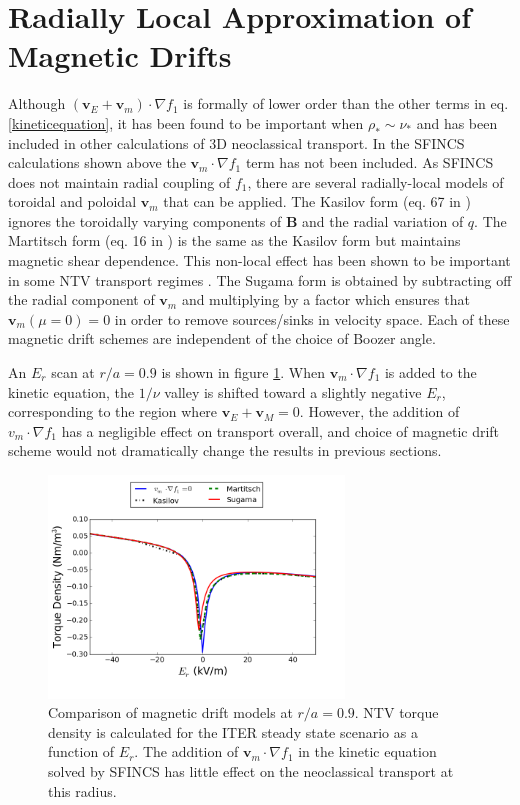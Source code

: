 \documentclass{article}
\numberwithin{figure}{section}
\numberwithin{equation}{section}
\begin{document}
\FloatBarrier

\section{Radially Local Approximation of Magnetic Drifts}\label{mds}
Although $(\bm{v}_E + \bm{v}_m) \cdot \nabla f_1$ is formally of lower order than the other terms in eq. \ref{kineticequation}, it has been found to be important when $\rho_* \sim \nu_*$ and has been included in other calculations of 3D neoclassical transport. In the SFINCS calculations shown above the $\bm{v}_m \cdot \nabla f_1$ term has not been included. As SFINCS does not maintain radial coupling of $f_1$, there are several radially-local models of toroidal and poloidal $\bm{v}_m$ that can be applied.  The Kasilov form (eq. 67 in \cite{Kasilov2014}) ignores the toroidally varying components of $\bm{B}$ and the radial variation of $q$. The Martitsch form (eq. 16 in \cite{Martitsch2016}) is the same as the Kasilov form but maintains magnetic shear dependence. This non-local effect has been shown to be important in some NTV transport regimes \cite{Martitsch2016}. The Sugama form is obtained by subtracting off the radial component of $\bm{v}_m$ and multiplying by a factor which ensures that $\bm{v}_m (\mu = 0)  = 0$ in order to remove sources/sinks in velocity space. Each of these magnetic drift schemes are independent of the choice of Boozer angle. 

An $E_r$ scan at $r/a = 0.9$ is shown in figure \ref{fig:driftschemes}. When $\bm{v}_m \cdot \nabla f_1$ is added to the kinetic equation, the $1/\nu$ valley is shifted toward a slightly negative $E_r$, corresponding to the region where $\bm{v}_E + \bm{v}_M = 0$. However, the addition of $v_m \cdot \nabla f_1$ has a negligible effect on transport overall, and choice of magnetic drift scheme would not dramatically change the results in previous sections.  

\begin{figure}[h!]
\centering
\includegraphics[width=0.7\textwidth]{mdscomparison.png}
\caption{\label{fig:driftschemes} Comparison of magnetic drift models at $r/a = 0.9$. NTV torque density is calculated for the ITER steady state scenario as a function of $E_r$. The addition of $\bm{v}_m \cdot \nabla f_1$ in the kinetic equation solved by SFINCS has little effect on the neoclassical transport at this radius. }
\end{figure}
\end{document}

